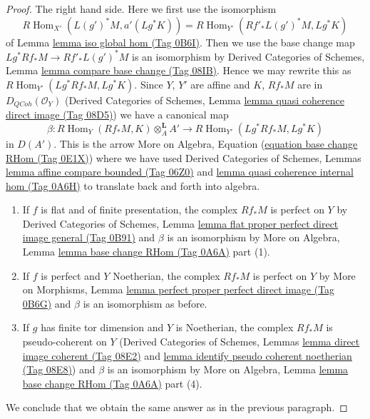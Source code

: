 \documentclass{amsart}
\theoremstyle{plain}
\theoremstyle{definition}
\theoremstyle{remark}
\numberwithin{equation}{subsection}
\def\Hom{\mathop{\mathrm{Hom}}\nolimits}
\def\QCoh{\mathit{QCoh}}
\begin{document}
\begin{proof}
\medskip\noindent
The right hand side. Here we first use the isomorphism
$$
R\Hom_{X'}(L(g')^*M, a'(Lg^*K)) = R\Hom_{Y'}(Rf'_*L(g')^*M, Lg^*K)
$$
of Lemma \href{https://stacks.math.columbia.edu/tag/0B6I}{lemma iso global hom (Tag 0B6I)}. Then we use the base change
map $Lg^*Rf_*M \to Rf'_*L(g')^*M$ is an isomorphism by
Derived Categories of Schemes, Lemma \href{https://stacks.math.columbia.edu/tag/08IB}{lemma compare base change (Tag 08IB)}.
Hence we may rewrite this as $R\Hom_{Y'}(Lg^*Rf_*M, Lg^*K)$.
Since $Y$, $Y'$ are affine and $K$, $Rf_*M$ are in $D_\QCoh(\mathcal{O}_Y)$
(Derived Categories of Schemes, Lemma
\href{https://stacks.math.columbia.edu/tag/08D5}{lemma quasi coherence direct image (Tag 08D5)})
we have a canonical map
$$
\beta :
R\Hom_Y(Rf_*M, K) \otimes^\mathbf{L}_A A'
\longrightarrow
R\Hom_{Y'}(Lg^*Rf_*M, Lg^*K)
$$
in $D(A')$. This is the arrow
More on Algebra, Equation (\href{https://stacks.math.columbia.edu/tag/0E1X}{equation base change RHom (Tag 0E1X)})
where we have used Derived Categories of Schemes, Lemmas
\href{https://stacks.math.columbia.edu/tag/06Z0}{lemma affine compare bounded (Tag 06Z0)} and
\href{https://stacks.math.columbia.edu/tag/0A6H}{lemma quasi coherence internal hom (Tag 0A6H)}
to translate back and forth into algebra.
\begin{enumerate}
\item If $f$ is flat and of finite presentation, the complex $Rf_*M$
is perfect on $Y$ by Derived Categories of Schemes, Lemma
\href{https://stacks.math.columbia.edu/tag/0B91}{lemma flat proper perfect direct image general (Tag 0B91)}
and $\beta$ is an isomorphism by
More on Algebra, Lemma \href{https://stacks.math.columbia.edu/tag/0A6A}{lemma base change RHom (Tag 0A6A)} part (1).
\item If $f$ is perfect and $Y$ Noetherian, the complex $Rf_*M$
is perfect on $Y$ by More on Morphisms, Lemma
\href{https://stacks.math.columbia.edu/tag/0B6G}{lemma perfect proper perfect direct image (Tag 0B6G)}
and $\beta$ is an isomorphism as before.
\item If $g$ has finite tor dimension and $Y$ is Noetherian,
the complex $Rf_*M$ is pseudo-coherent on $Y$
(Derived Categories of Schemes, Lemmas
\href{https://stacks.math.columbia.edu/tag/08E2}{lemma direct image coherent (Tag 08E2)} and
\href{https://stacks.math.columbia.edu/tag/08E8}{lemma identify pseudo coherent noetherian (Tag 08E8)})
and $\beta$ is an isomorphism by
More on Algebra, Lemma \href{https://stacks.math.columbia.edu/tag/0A6A}{lemma base change RHom (Tag 0A6A)} part (4).
\end{enumerate}
We conclude that we obtain the same answer as in the previous paragraph.


\end{proof}
\end{document}
